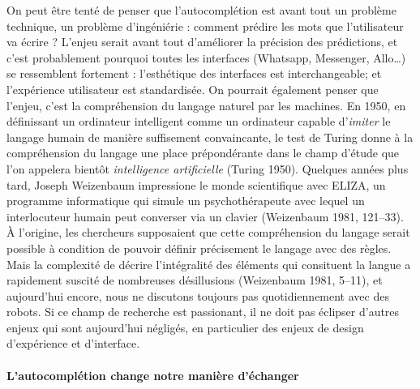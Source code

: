 \documentclass[]{article}
\let\oldparagraph\paragraph
\renewcommand{\paragraph}[1]{\oldparagraph{#1}\mbox{}}
\begin{document}
On peut être tenté de penser que l'autocomplétion est avant tout un
problème technique, un problème d'ingéniérie : comment prédire les mots
que l'utilisateur va écrire ? L'enjeu serait avant tout d'améliorer la
précision des prédictions, et c'est probablement pourquoi toutes les
interfaces (Whatsapp, Messenger, Allo\ldots{}) se ressemblent fortement
: l'esthétique des interfaces est interchangeable; et l'expérience
utilisateur est standardisée. On pourrait également penser que l'enjeu,
c'est la compréhension du langage naturel par les machines. En 1950, en
définissant un ordinateur intelligent comme un ordinateur capable
d'\emph{imiter} le langage humain de manière suffisement convaincante,
le test de Turing donne à la compréhension du langage une place
prépondérante dans le champ d'étude que l'on appelera bientôt
\emph{intelligence artificielle} (Turing 1950). Quelques années plus
tard, Joseph Weizenbaum impressione le monde scientifique avec ELIZA, un
programme informatique qui simule un psychothérapeute avec lequel un
interlocuteur humain peut converser via un clavier (Weizenbaum 1981,
121--33).\\
À l'origine, les chercheurs supposaient que cette compréhension du
langage serait possible à condition de pouvoir définir précisement le
langage avec des règles. Mais la complexité de décrire l'intégralité des
éléments qui consituent la langue a rapidement suscité de nombreuses
désillusions (Weizenbaum 1981, 5--11), et aujourd'hui encore, nous ne
discutons toujours pas quotidiennement avec des robots. Si ce champ de
recherche est passionant, il ne doit pas éclipser d'autres enjeux qui
sont aujourd'hui négligés, en particulier des enjeux de design
d'expérience et d'interface.

\hypertarget{lautocompluxe9tion-change-notre-maniuxe8re-duxe9changer}{%
\paragraph{L'autocomplétion change notre manière
d'échanger}\label{lautocompluxe9tion-change-notre-maniuxe8re-duxe9changer}}
\end{document}
